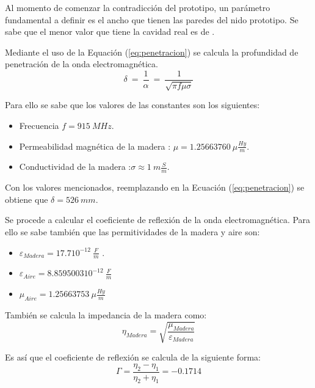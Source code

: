 



Al momento de comenzar la contradicción del prototipo, un parámetro fundamental a definir es el ancho que tienen las paredes del nido prototipo. Se sabe que el menor valor que tiene la cavidad real es de  \cite{ref:PaperValeriaOjeda}.

Mediante el uso de la Equación (\ref{eq:penetracion}) se calcula la profundidad de penetración de la onda electromagnética.
\begin{equation}
\delta \ = \ \frac{1}{\alpha} \ =\ \frac{1}{\sqrt{\pi f \mu \sigma}}
\label{eq:penetracion}
\end{equation}

Para ello se sabe que los valores de las constantes son los siguientes:
\begin{itemize}
	\item Frecuencia $f = 915 \ MHz$.
	\item Permeabilidad magnética de la madera \cite{ref:permeabilidad_madera}: $\mu = 1.25663760 \ \mu \frac{Hy}{m}$.
	\item Conductividad de la madera \cite{ref:conductividad_madera}:$\sigma \approx 1 \ m\frac{S}{m}$.
\end{itemize}

Con los valores mencionados, reemplazando en la Ecuación (\ref{eq:penetracion}) se obtiene que $\delta = 526 \ mm$.

Se procede a calcular el coeficiente de reflexión de la onda electromagnética. Para ello se sabe también que las permitividades de la madera y aire son:
\begin{itemize}
	\item $\varepsilon_{Madera} = 17.7 10^{-12} \ \frac{F}{m}$ \cite{ref:varepsilon_madera}.
	\item $\varepsilon_{Aire} = 8.8595003 10^{-12} \ \frac{F}{m}$
	\item $\mu_{Aire} = 1.25663753 \ \mu \frac{ Hy}{m}$ 
\end{itemize}

También se calcula la impedancia de la madera como:
\begin{equation}
	\eta_{Madera}=\sqrt{\frac{\mu_{Madera}}{\varepsilon_{Madera}}}
\end{equation}

Es así que el coeficiente de reflexión se calcula de la siguiente forma:
\begin{equation}
	\Gamma = \frac{\eta_2 - \eta_1  }{\eta_2 + \eta_1} = -0.1714
	\label{eq:reflexion_madera}
\end{equation}


